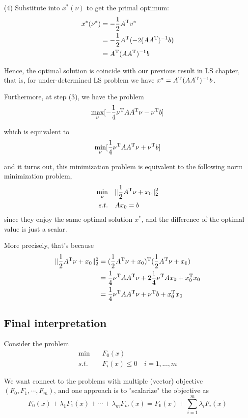 \begin{example}
	(4) Substitute into $x^*(\nu)$ to get the primal optimum:
	\begin{align*}
	x^*(\nu^*) 
	&=-\frac{1}{2} A^{{\rm T}} v^* \\
	&= -\frac{1}{2}A^{{\rm T}}(-2(AA^{{\rm T}})^{-1}b)\\
	&= A^{{\rm T}}(AA^{{\rm T}})^{-1}b
	\end{align*}

Hence, the optimal solution is coincide with our previous result in LS chapter, that is, for under-determined LS problem we have $x^* = A^{{\rm T}}(AA^{{\rm T}})^{-1}b$.

Furthermore, at step (3), we have the problem
$$\max_{\nu} [- \frac{1}{4}\nu^{{\rm T}}AA^{{\rm T}}\nu - \nu^{{\rm T}}b ]$$

which is equivalent to 
$$\min_{\nu} [\frac{1}{4}\nu^{{\rm T}}AA^{{\rm T}}\nu + \nu^{{\rm T}}b ]$$

and it turns out, this minimization problem is equivalent to the following norm minimization problem,
\begin{align*}
\min_\nu\quad & \Vert\frac{1}{2}A^{{\rm T}}\nu + x_0\Vert^2_2\\
s.t.\quad & Ax_0 = b 
\end{align*}
since they enjoy the same optimal solution $x^*$, and the difference of the optimal value is just a scalar.

More precisely, that's because
\begin{align*}
	\Vert \frac{1}{2}A^{{\rm T}}\nu + x_0\Vert_2^2 
	&= (\frac{1}{2}A^{{\rm T}}\nu+x_0)^{{\rm T}}(\frac{1}{2}A^{{\rm T}}\nu+x_0)\\
	&= \frac{1}{4}\nu^{{\rm T}}AA^{{\rm T}}\nu + 2\frac{1}{4}\nu^{{\rm T}}Ax_0 + x_0^{{\rm T}}x_0\\
	&= \frac{1}{4}\nu^{{\rm T}}AA^{{\rm T}}\nu + \nu^{{\rm T}}b+x_0^{{\rm T}}x_0
\end{align*}

\end{example}


\subsection{Final interpretation}
Consider the problem
\begin{align*}
	\min \quad & F_0(x)\\
	s.t. \quad & F_i(x)\leq 0\quad i = 1,...,m
\end{align*}

We want connect to the problems with multiple (vector) objective $(F_0,F_1,\cdots,F_m)$, and one approach is to "scalarize" the objective as 
\begin{equation*}
	F_0(x) + \lambda_1 F_1(x) + \cdots + \lambda_mF_m(x) = F_0(x) + \sum^m_{i=1}\lambda_iF_i(x)
\end{equation*}

